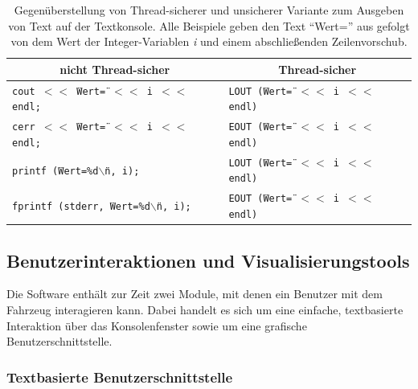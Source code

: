 \documentclass[a4paper, 11pt]{article}
\begin{document}
{\begin{table}
\centering
\begin{tabular}{|p{}|p{}|}
\hline
\multicolumn{1}{|c|}{nicht Thread-sicher} & \multicolumn{1}{c|}{Thread-sicher} \\
\hline
\tt cout $\!<<\!$ \"{}Wert=\"{} $\!<<\!$ i $\!<<\!$ endl; &
\tt LOUT (\"{}Wert=\"{} $\!<<\!$ i $\!<<\!$ endl) \\
\tt cerr $\!<<\!$ \"{}Wert=\"{} $\!<<\!$ i $\!<<\!$ endl; &
\tt EOUT (\"{}Wert=\"{} $\!<<\!$ i $\!<<\!$ endl) \\
\tt printf (\"{}Wert=\%d$\backslash$n\"{}, i); & 
\tt LOUT (\"{}Wert=\"{} $\!<<\!$ i $\!<<\!$ endl) \\
\tt fprintf (stderr, \"{}Wert=\%d$\backslash$n\"{}, i); & 
\tt EOUT (\"{}Wert=\"{} $\!<<\!$ i $\!<<\!$ endl) \\
\hline
\end{tabular}
\caption{Gegenüberstellung von Thread-sicherer und unsicherer Variante zum Ausgeben von Text auf der Textkonsole. Alle Beispiele geben den Text "`Wert="' aus gefolgt von dem Wert der Integer-Variablen \textit{i} und einem abschließenden Zeilenvorschub.}
\label{tab:thread_safe_logging}
\end{table}

\subsection{Benutzerinteraktionen und Visualisierungstools}

Die Software enthält zur Zeit zwei Module, mit denen ein Benutzer mit dem Fahrzeug interagieren kann. Dabei handelt es sich um eine einfache, textbasierte Interaktion über das Konsolenfenster sowie um eine grafische Benutzerschnittstelle.

\subsubsection{Textbasierte Benutzerschnittstelle}
\label{sec:tui}

}
\end{document}
